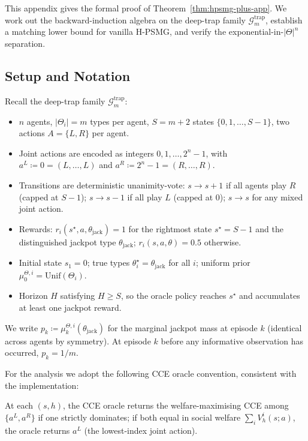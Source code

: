 This appendix gives the formal proof of Theorem~\ref{thm:hpsmg-plus-app}. We work out the backward-induction algebra on the deep-trap family $\mathcal{G}_m^{\mathrm{trap}}$, establish a matching lower bound for vanilla H-PSMG, and verify the exponential-in-$|\Theta|^n$ separation.

\subsection{Setup and Notation}
\label{app:hpsmg-plus-setup}

Recall the deep-trap family $\mathcal{G}_m^{\mathrm{trap}}$:
\begin{itemize}
\item $n$ agents, $|\Theta_i| = m$ types per agent, $S = m+2$ states $\{0, 1, \ldots, S-1\}$, two actions $A = \{L, R\}$ per agent.
\item Joint actions are encoded as integers $0, 1, \ldots, 2^n - 1$, with $a^L \coloneqq 0 = (L, \ldots, L)$ and $a^R \coloneqq 2^n - 1 = (R, \ldots, R)$.
\item Transitions are deterministic unanimity-vote: $s \to s+1$ if all agents play $R$ (capped at $S-1$); $s \to s-1$ if all play $L$ (capped at $0$); $s \to s$ for any mixed joint action.
\item Rewards: $r_i(s^\star, a, \theta_{\mathrm{jack}}) = 1$ for the rightmost state $s^\star = S-1$ and the distinguished jackpot type $\theta_{\mathrm{jack}}$; $r_i(s, a, \theta) = 0.5$ otherwise.
\item Initial state $s_1 = 0$; true types $\theta_i^\star = \theta_{\mathrm{jack}}$ for all $i$; uniform prior $\mu_0^{\Theta, i} = \mathrm{Unif}(\Theta_i)$.
\item Horizon $H$ satisfying $H \geq S$, so the oracle policy reaches $s^\star$ and accumulates at least one jackpot reward.
\end{itemize}

We write $p_k \coloneqq \mu_k^{\Theta, i}(\theta_{\mathrm{jack}})$ for the marginal jackpot mass at episode $k$ (identical across agents by symmetry). At episode $k$ before any informative observation has occurred, $p_k = 1/m$.

For the analysis we adopt the following CCE oracle convention, consistent with the implementation:

\begin{assumption}
\label{ass:cce-tiebreak}
At each $(s, h)$, the CCE oracle returns the welfare-maximising CCE among $\{a^L, a^R\}$ if one strictly dominates; if both equal in social welfare $\sum_i V_h^i(s; a)$, the oracle returns $a^L$ (the lowest-index joint action).
\end{assumption}

